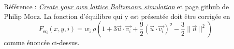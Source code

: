 \documentclass[11pt,class=report,crop=false]{standalone}
\begin{document}
\bigskip

Référence :  \href{https://medium.com/swlh/create-your-own-lattice-boltzmann-simulation-with-python-8759e8b53b1c}{\emph{Create your own lattice Boltzmann simulation}}
et  
\href{https://github.com/pmocz/latticeboltzmann-python}{page github}
de Philip Mocz.
La fonction d'équilibre qui y est présentée doit être corrigée en
$$F_{\text{eq}} (x,y,i) = w_i \, \rho \left(1 + 3 \vec{u} \cdot \vec{v_i}  +  \frac92(\vec{u} \cdot \vec{v_i})^2 - \frac32 \| \vec u \| ^2 \right)$$
 comme énoncée ci-dessus.
\end{document}
